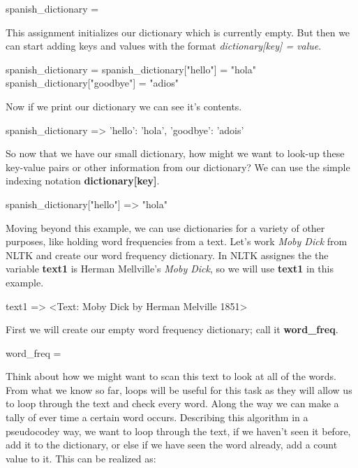 \begin{python}
spanish_dictionary = {}
\end{python}

This assignment initializes our dictionary which is currently empty. But then we can start adding keys and values with the format \textit{ dictionary[key] = value}.

\begin{python}
spanish_dictionary = {}
spanish_dictionary["hello"] = "hola"
spanish_dictionary["goodbye"] = "adios"
\end{python}

Now if we print our dictionary we can see it's contents.

\begin{python}
spanish_dictionary
=> {'hello': 'hola', 'goodbye': 'adois'}
\end{python}

So now that we have our small dictionary, how might we want to look-up these key-value pairs or other information from our dictionary? We can use the simple indexing notation \textbf{dictionary[key]}. 

\begin{python}
spanish_dictionary["hello"]
=> "hola"
\end{python}


Moving beyond this example, we can use dictionaries for a variety of other purposes, like holding word frequencies from a text. Let's work \textit{Moby Dick} from NLTK and create our word frequency dictionary. In NLTK assignes the the variable \textbf{text1} is Herman Mellville's \textit{Moby Dick}, so we will use \textbf{text1} in this example. 

\begin{python}
text1 
=> <Text: Moby Dick by Herman Melville 1851>
\end{python}

First we will create our empty word frequency dictionary; call it \textbf{word\_freq}.

\begin{python}
word_freq = {}
\end{python}

Think about how we might want to scan this text to look at all of the words. From what we know so far, loops will be useful for this task as they will allow us to loop through the text and check every word. Along the way we can make a tally of ever time a certain word occurs. Describing this algorithm in a pseudocodey way, we want to loop through the text, if we haven't seen it before, add it to the dictionary, or else if we have seen the word already, add a count value to it. This can be realized as:

